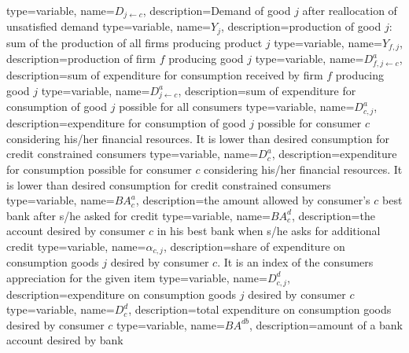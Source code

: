 {%
  type=variable,%
  name={$D_{j\leftarrow c}$},%
  description={Demand of good $j$ after reallocation of unsatisfied demand} 
}
{%
  type=variable,%
  name={$Y_{j}$},%
  description={production of good $j$: sum of the production of all firms producing product $j$} 
}
{%
  type=variable,%
  name={$Y_{f,j}$},%
  description={production of firm $f$ producing good $j$} 
}
{%
  type=variable,%
  name={$D^a_{f,j\leftarrow c}$},%
  description={sum of expenditure for consumption received by firm $f$ producing good $j$} 
}
{%
  type=variable,%
  name={$D^a_{j\leftarrow c}$},%
  description={sum of expenditure for consumption of good $j$ possible for all consumers} 
}
{%
  type=variable,%
  name={$D^a_{c,j}$},%
  description={expenditure for consumption of good $j$ possible for consumer $c$ considering his/her financial resources. It is lower than desired consumption for credit constrained consumers} 
}
{%
  type=variable,%
  name={$D^a_{c}$},%
  description={expenditure for consumption possible for consumer $c$ considering his/her financial resources. It is lower than desired consumption for credit constrained consumers} 
}
{%
  type=variable,%
  name={$BA^a_{c}$},%
  description={the amount allowed by consumer's $c$ best bank after s/he asked for credit} 
}
{%
  type=variable,%
  name={$BA^d_{c}$},%
  description={the account desired by consumer $c$ in his best bank when s/he asks for additional credit} 
}
{%
  type=variable,%
  name={$\alpha_{c,j}$},%
  description={share of expenditure on consumption goods $j$ desired by consumer $c$. It is an index of the consumers appreciation for the given item} 
}
{%
  type=variable,%
  name={$D^{d}_{c,j}$},%
  description={expenditure on consumption goods $j$ desired by consumer $c$} 
}
{%
  type=variable,%
  name={$D^{d}_{c}$},%
  description={total expenditure on consumption goods desired by consumer $c$} 
}
{%
  type=variable,%
  name={$BA^{db}$},%
  description={amount of a bank account desired by bank} 
}
